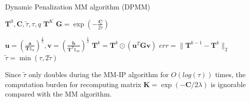 \documentclass[conference]{IEEEtran}
\newcommand{\one}{\mathds{1}}
\newcommand{\mat}[1]{\mathbf{#1}}
\renewcommand{\vec}[1]{\bm{#1}}
\begin{document}
\begin{algorithm}[t]
\caption{Dynamic Penalization MM algorithm (DPMM)}
\begin{algorithmic}[t]
\label{Alg1}
\renewcommand{\algorithmicrequire}{\textbf{Input:}}
\renewcommand{\algorithmicensure}{\textbf{Output:}}
\REQUIRE $\mat{T}^0, \mat C, \tilde{\tau}, \tau, q$
\ENSURE $\mat T^{K}$
\STATE $\mat G = \operatorname{exp}(-\frac{\mat{C}}{2\tilde{\tau}})$

\STATE $\vec{u} = (\frac{\vec{a}}{\mat T \one_n})^{\frac{1}{2}}, \vec v=(\frac{\vec{b}}{\mat{T}^{T} \one_m})^{\frac{1}{2}}$
\STATE $\mat{T}^{k} = \mat T^{k} \odot ( \vec{u}^{T} \mat G \vec{v})$
\STATE $err = \|\mat T^{k-1} - \mat T^{k}\|_2$
\STATE $\tilde{\tau} = \min(\tau, 2\tilde{\tau})$
\ENDIF
\ENDFOR
\end{algorithmic}
\end{algorithm}
Since $\tilde{\tau}$ only doubles during the MM-IP algorithm for $O(log(\tau))$ times, the computation burden for recomputing matrix $\mat K = \exp \left(-{\mat C}/{2 \lambda}\right)$ is ignorable compared with the MM algorithm.
\end{document}
